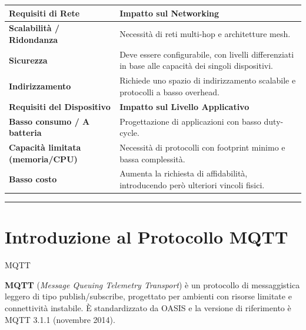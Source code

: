 \documentclass[
  italian,
  openany]{book}
\newcounter{none} %
\begin{document}
{\def\LTcaptype{none} %
\begin{longtable}[]{@{}
  >{\raggedright\arraybackslash}p{}
  >{\raggedright\arraybackslash}p{}@{}}
\toprule\noalign{}
\begin{minipage}[b]{\linewidth}\raggedright
\textbf{Requisiti di Rete}
\end{minipage} & \begin{minipage}[b]{\linewidth}\raggedright
\textbf{Impatto sul Networking}
\end{minipage} \\
\midrule\noalign{}
\endhead
\bottomrule\noalign{}
\endlastfoot
\textbf{Scalabilità / Ridondanza} & Necessità di reti multi-hop e
architetture mesh. \\
\textbf{Sicurezza} & Deve essere configurabile, con livelli
differenziati in base alle capacità dei singoli dispositivi. \\
\textbf{Indirizzamento} & Richiede uno spazio di indirizzamento
scalabile e protocolli a basso overhead. \\
\textbf{Requisiti del Dispositivo} & \textbf{Impatto sul Livello
Applicativo} \\
\textbf{Basso consumo / A batteria} & Progettazione di applicazioni con
basso duty-cycle. \\
\textbf{Capacità limitata (memoria/CPU)} & Necessità di protocolli con
footprint minimo e bassa complessità. \\
\textbf{Basso costo} & Aumenta la richiesta di affidabilità,
introducendo però ulteriori vincoli fisici. \\
\end{longtable}
}

\begin{center}\rule{0.5\linewidth}{0.5pt}\end{center}

\section{Introduzione al Protocollo
MQTT}\label{introduzione-al-protocollo-mqtt}

\begin{calloutdefinition}{MQTT}

\textbf{MQTT} (\emph{Message Queuing Telemetry Transport}) è un
protocollo di messaggistica leggero di tipo publish/subscribe,
progettato per ambienti con risorse limitate e connettività instabile. È
standardizzato da OASIS e la versione di riferimento è MQTT 3.1.1
(novembre 2014).

\end{calloutdefinition}
\end{document}
